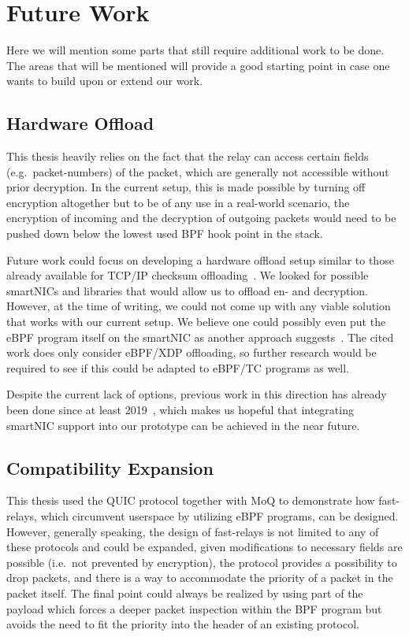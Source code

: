 \section{Future Work}\label{sec:future_work}

Here we will mention some parts that still require additional work 
to be done.
The areas that will be mentioned will provide a good starting point
in case one wants to build upon or extend our work.

\subsection{Hardware Offload}
This thesis heavily relies on the fact that the relay can
access certain fields (e.g.~packet-numbers) of the packet, 
which are generally not accessible without prior decryption.
In the current setup, this is made possible by turning off 
encryption altogether but to be of any use in a real-world
scenario, the encryption of incoming and the decryption of
outgoing packets would need to be pushed down below the lowest 
used BPF hook point in the stack.

Future work could focus on developing a hardware offload 
setup similar to those already available for TCP/IP checksum 
offloading~\parencite{tcp-ip-offload-engine}.
We looked for possible smartNICs and libraries that would allow us
to offload en- and decryption.
However, at the time of writing, we could not come up with any viable solution
that works with our current setup. 
We believe one could possibly even put the eBPF program itself on the smartNIC as 
another approach suggests~\parencite{ebpf-offload-smartnics}.
The cited work does only consider eBPF/XDP offloading, so further 
research would be required to see if this could be adapted to eBPF/TC 
programs as well.

Despite the current lack of options, previous work in this direction has already been 
done since at least 2019~\parencite{quic-nic-offload}, which makes us hopeful that
integrating smartNIC support into our prototype can be achieved in the near future.

\subsection{Compatibility Expansion}\label{sec:compatibility_expansion}
This thesis used the QUIC protocol together with MoQ to demonstrate how fast-relays, 
which circumvent userspace by utilizing eBPF programs, can be designed.
However, generally speaking, the design of fast-relays is not limited to
any of these protocols and could be expanded, given modifications to 
necessary fields are possible (i.e.~not prevented by encryption),
the protocol provides a possibility to drop packets,
and there is a way to accommodate the priority of a packet in the packet itself.
The final point could always be realized by using part of the payload
which forces a deeper packet inspection within the BPF program but 
avoids the need to fit the priority into the header of an existing 
protocol.

